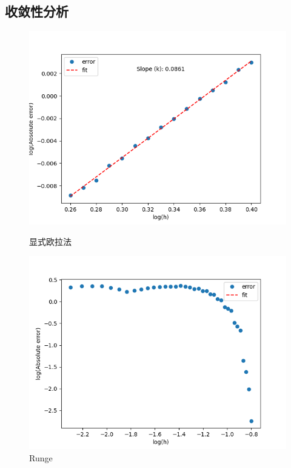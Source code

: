 \documentclass[12pt, a4paper, oneside]{ctexart}
\begin{document}
\begin{spacing}{2.0}
\subsection{收敛性分析}
\begin{figure}[H]
    \begin{minipage}[t]{0.5\linewidth}
        \centering
        \includegraphics[scale=0.3]{EE-dfit.png}
        \caption{显式欧拉法}
        \label{fig:side:a}
      \end{minipage}%
      \begin{minipage}[t]{0.5\linewidth}
        \centering
        \includegraphics[scale=0.3]{Runge_Kutta4-fit.png}
        \caption{Runge}
        \label{fig:side:b}
      \end{minipage}
\end{figure}


\end{spacing}
\end{document}
